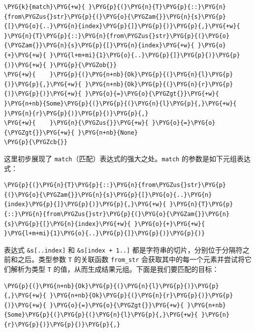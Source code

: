 \begin{Verbatim}[commandchars=\\\{\},breaklines=true,breakanywhere=true,fontsize=\codefont,xleftmargin=17bp]
\PYG{k}{match}\PYG{+w}{ }\PYG{p}{(}\PYG{n}{T}\PYG{p}{::}\PYG{n}{from\PYGZus{}str}\PYG{p}{(}\PYG{o}{\PYGZam{}}\PYG{n}{s}\PYG{p}{[}\PYG{o}{..}\PYG{n}{index}\PYG{p}{]}\PYG{p}{)}\PYG{p}{,}\PYG{+w}{ }\PYG{n}{T}\PYG{p}{::}\PYG{n}{from\PYGZus{}str}\PYG{p}{(}\PYG{o}{\PYGZam{}}\PYG{n}{s}\PYG{p}{[}\PYG{n}{index}\PYG{+w}{ }\PYG{o}{+}\PYG{+w}{ }\PYG{l+m+mi}{1}\PYG{o}{..}\PYG{p}{]}\PYG{p}{)}\PYG{p}{)}\PYG{+w}{ }\PYG{p}{\PYGZob{}}
\PYG{+w}{    }\PYG{p}{(}\PYG{n+nb}{Ok}\PYG{p}{(}\PYG{n}{l}\PYG{p}{)}\PYG{p}{,}\PYG{+w}{ }\PYG{n+nb}{Ok}\PYG{p}{(}\PYG{n}{r}\PYG{p}{)}\PYG{p}{)}\PYG{+w}{ }\PYG{o}{=}\PYG{o}{\PYGZgt{}}\PYG{+w}{ }\PYG{n+nb}{Some}\PYG{p}{(}\PYG{p}{(}\PYG{n}{l}\PYG{p}{,}\PYG{+w}{ }\PYG{n}{r}\PYG{p}{)}\PYG{p}{)}\PYG{p}{,}
\PYG{+w}{    }\PYG{n}{\PYGZus{}}\PYG{+w}{ }\PYG{o}{=}\PYG{o}{\PYGZgt{}}\PYG{+w}{ }\PYG{n+nb}{None}
\PYG{p}{\PYGZcb{}}
\end{Verbatim}

这里初步展现了 \texttt{match}（匹配）表达式的强大之处。\texttt{match} 的参数是如下元组表达式：

\begin{Verbatim}[commandchars=\\\{\},breaklines=true,breakanywhere=true,fontsize=\codefont,xleftmargin=17bp]
\PYG{p}{(}\PYG{n}{T}\PYG{p}{::}\PYG{n}{from\PYGZus{}str}\PYG{p}{(}\PYG{o}{\PYGZam{}}\PYG{n}{s}\PYG{p}{[}\PYG{o}{..}\PYG{n}{index}\PYG{p}{]}\PYG{p}{)}\PYG{p}{,}\PYG{+w}{ }\PYG{n}{T}\PYG{p}{::}\PYG{n}{from\PYGZus{}str}\PYG{p}{(}\PYG{o}{\PYGZam{}}\PYG{n}{s}\PYG{p}{[}\PYG{n}{index}\PYG{+w}{ }\PYG{o}{+}\PYG{+w}{ }\PYG{l+m+mi}{1}\PYG{o}{..}\PYG{p}{]}\PYG{p}{)}\PYG{p}{)}
\end{Verbatim}

表达式 \texttt{\&s[..index]} 和 \texttt{\&s[index + 1..]} 都是字符串的切片，分别位于分隔符之前和之后。类型参数 \texttt{T} 的关联函数 \texttt{from\_str} 会获取其中的每一个元素并尝试将它们解析为类型 \texttt{T} 的值，从而生成结果元组。下面是我们要匹配的目标：

\begin{Verbatim}[commandchars=\\\{\},breaklines=true,breakanywhere=true,fontsize=\codefont,xleftmargin=17bp]
\PYG{p}{(}\PYG{n+nb}{Ok}\PYG{p}{(}\PYG{n}{l}\PYG{p}{)}\PYG{p}{,}\PYG{+w}{ }\PYG{n+nb}{Ok}\PYG{p}{(}\PYG{n}{r}\PYG{p}{)}\PYG{p}{)}\PYG{+w}{ }\PYG{o}{=}\PYG{o}{\PYGZgt{}}\PYG{+w}{ }\PYG{n+nb}{Some}\PYG{p}{(}\PYG{p}{(}\PYG{n}{l}\PYG{p}{,}\PYG{+w}{ }\PYG{n}{r}\PYG{p}{)}\PYG{p}{)}\PYG{p}{,}
\end{Verbatim}

